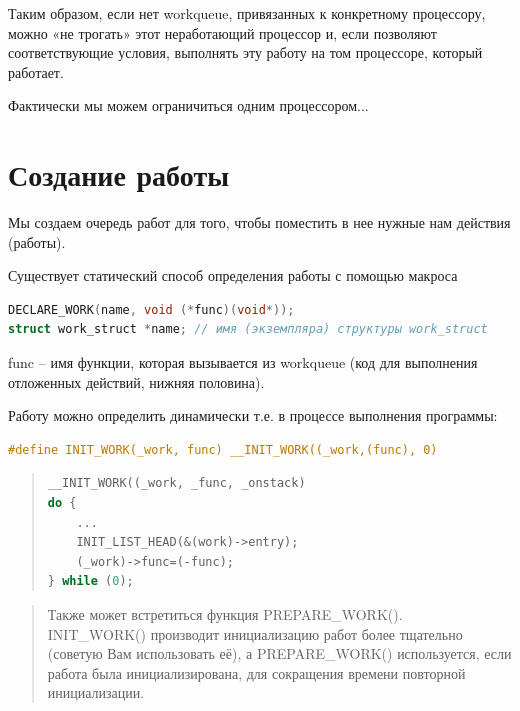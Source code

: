 Таким образом, если нет workqueue, привязанных к конкретному процессору, можно «не трогать» этот неработающий процессор и, если позволяют соответствующие условия, выполнять эту работу на том процессоре, который работает.

Фактически мы можем ограничиться одним процессором...

\section{Создание работы}
\par Мы создаем очередь работ для того, чтобы поместить в нее нужные нам действия (работы). 

\par Существует статический способ определения работы с помощью макроса

\begin{lstlisting}[language=C, label=lst:1, caption=Статический способ определения]
DECLARE_WORK(name, void (*func)(void*));
struct work_struct *name; // имя (экземпляра) структуры work_struct
\end{lstlisting}

func -- имя функции, которая вызывается из workqueue (код для выполнения отложенных действий, нижняя половина).

\par Работу можно определить динамически т.е. в процессе выполнения программы:
\begin{lstlisting}[language=C, label=lst:1, caption=Динамический способ определения]
#define INIT_WORK(_work, func) __INIT_WORK((_work,(func), 0)
\end{lstlisting}

\begin{quote}
\begin{lstlisting}[language=C, label=lst:1, caption=Определение \_\_INIT\_WORK()]
__INIT_WORK((_work, _func, _onstack)
do {
    ...
    INIT_LIST_HEAD(&(work)->entry);
    (_work)->func=(-func);
} while (0);
\end{lstlisting}
\end{quote}

\begin{quote}
Также может встретиться функция PREPARE\_WORK(). \\ INIT\_WORK() производит инициализацию работ более тщательно (советую Вам использовать её), а PREPARE\_WORK() используется, если работа была инициализирована, для сокращения времени повторной инициализации.
\end{quote}

